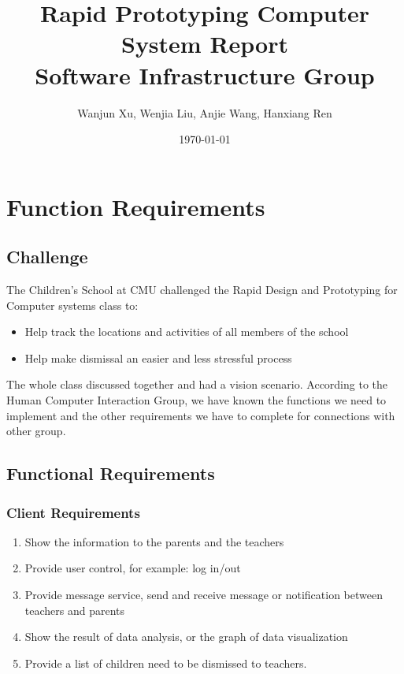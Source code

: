 \documentclass{article}
\begin{document}
	
\title{Rapid Prototyping Computer System Report\\Software Infrastructure Group}
\author{Wanjun Xu, Wenjia Liu, Anjie Wang, Hanxiang Ren}
\date{\today}
\maketitle

\newpage

\tableofcontents

\newpage

\section{Function Requirements}

\subsection{Challenge}
 The Children’s School at CMU challenged the Rapid Design and Prototyping for Computer systems class to:
\begin{itemize}
	\item Help track the locations and activities of all members of the school 
	\item Help make dismissal an easier and less stressful process 
\end{itemize}

The whole class discussed together and had a vision scenario. According to the Human Computer Interaction Group, we have known the functions we need to implement and the other requirements we have to complete for connections with other group.

\subsection{Functional Requirements}
\subsubsection{Client Requirements}
\begin{enumerate}
	\item Show the information to the parents and the teachers
	\item Provide user control, for example: log in/out
	\item Provide message service, send and receive message or notification between teachers and parents 
	\item Show the result of data analysis, or the graph of data visualization
	\item Provide a list of children need to be dismissed to teachers.
\end{enumerate}
\end{document}
